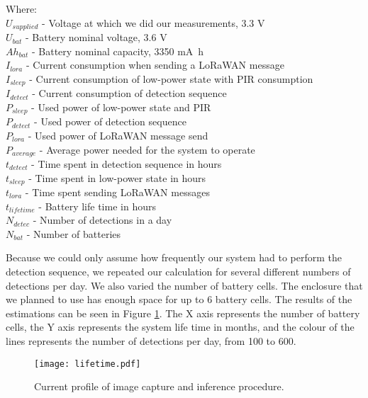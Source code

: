 Where:\\
$U_{supplied}$ - Voltage at which we did our measurements, 3.3 V\\
$U_{bat}$ - Battery nominal voltage, 3.6 V\\
$Ah_{bat}$ - Battery nominal capacity, 3350 \si{\milli\ampere\hour}\\
$I_{lora}$ - Current consumption when sending a LoRaWAN message\\
$I_{sleep}$ - Current consumption of low-power state with PIR consumption\\
$I_{detect}$ - Current consumption of detection sequence\\
$P_{sleep}$ - Used power of low-power state and PIR\\
$P_{detect}$ - Used power of detection sequence\\
$P_{lora}$ - Used power of LoRaWAN message send\\
$P_{average}$ - Average power needed for the system to operate\\
$t_{detect}$ - Time spent in detection sequence in hours\\
$t_{sleep}$ - Time spent in low-power state in hours\\
$t_{lora}$  - Time spent sending LoRaWAN messages\\
$t_{lifetime}$ - Battery life time in hours\\
$N_{detec}$ - Number of detections in a day\\
$N_{bat}$ - Number of batteries

Because we could only assume how frequently our system had to perform the detection sequence, we repeated our calculation for several different numbers of detections per day.
We also varied the number of battery cells.
The enclosure that we planned to use has enough space for up to 6 battery cells.
The results of the estimations can be seen in Figure \ref{lifetime_figure}.
The X axis represents the number of battery cells, the Y axis represents the system life time in months, and the colour of the lines represents the number of detections per day, from 100 to 600.

\begin{figure}[ht]
    \centering
    \texttt{[image: lifetime.pdf]}
    \caption{ Current profile of image capture and inference procedure.}
    \label{lifetime_figure}
\end{figure}

